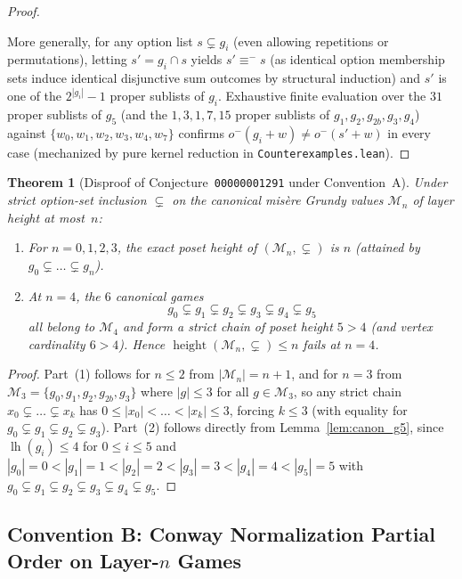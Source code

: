 \documentclass[11pt]{amsart}
\newtheorem{theorem}{Theorem}[section]
\theoremstyle{definition}
\theoremstyle{remark}
\newcommand{\Mlayer}{\mathcal{M}}
\DeclareMathOperator{\lh}{lh}
\DeclareMathOperator{\height}{height}
\begin{document}
\begin{proof}
\begin{itemize}
\end{itemize}
More generally, for any option list $s \subsetneq g_i$ (even allowing repetitions or permutations), letting $s' = g_i \cap s$ yields $s' \equiv^- s$ (as identical option membership sets induce identical disjunctive sum outcomes by structural induction) and $s'$ is one of the $2^{|g_i|} - 1$ proper sublists of $g_i$. Exhaustive finite evaluation over the $31$ proper sublists of $g_5$ (and the $1, 3, 1, 7, 15$ proper sublists of $g_1, g_2, g_{2b}, g_3, g_4$) against $\{w_0, w_1, w_2, w_3, w_4, w_7\}$ confirms $o^-(g_i + w) \neq o^-(s' + w)$ in every case (mechanized by pure kernel reduction in \texttt{Counterexamples.lean}).
\end{proof}

\begin{theorem}[Disproof of Conjecture~\texttt{00000001291} under Convention~A]
\label{thm:convA}
Under strict option-set inclusion $\subsetneq$ on the canonical mis\`ere Grundy values $\Mlayer_n$ of layer height at most~$n$:
\begin{enumerate}
  \item For $n = 0, 1, 2, 3$, the exact poset height of $(\Mlayer_n, \subsetneq)$ is $n$ (attained by $g_0 \subsetneq \dots \subsetneq g_n$).
  \item At $n = 4$, the $6$ canonical games
  \[
    g_0 \subsetneq g_1 \subsetneq g_2 \subsetneq g_3 \subsetneq g_4 \subsetneq g_5
  \]
  all belong to $\Mlayer_4$ and form a strict chain of poset height $5 > 4$ (and vertex cardinality $6 > 4$). Hence $\height(\Mlayer_n, \subsetneq) \le n$ fails at $n = 4$.
\end{enumerate}
\end{theorem}

\begin{proof}
Part~(1) follows for $n \le 2$ from $|\Mlayer_n| = n+1$, and for $n = 3$ from $\Mlayer_3 = \{g_0, g_1, g_2, g_{2b}, g_3\}$ where $|g| \le 3$ for all $g \in \Mlayer_3$, so any strict chain $x_0 \subsetneq \dots \subsetneq x_k$ has $0 \le |x_0| < \dots < |x_k| \le 3$, forcing $k \le 3$ (with equality for $g_0 \subsetneq g_1 \subsetneq g_2 \subsetneq g_3$). Part~(2) follows directly from Lemma~\ref{lem:canon_g5}, since $\lh(g_i) \le 4$ for $0 \le i \le 5$ and $|g_0|=0 < |g_1|=1 < |g_2|=2 < |g_3|=3 < |g_4|=4 < |g_5|=5$ with $g_0 \subsetneq g_1 \subsetneq g_2 \subsetneq g_3 \subsetneq g_4 \subsetneq g_5$.
\end{proof}

\subsection{Convention B: Conway Normalization Partial Order on Layer-\texorpdfstring{$n$}{n} Games}
\end{document}
